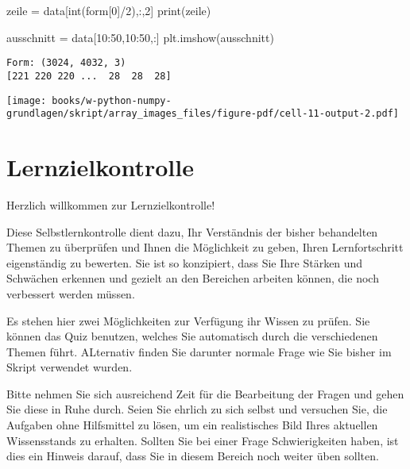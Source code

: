 \documentclass[
  letterpaper,
  DIV=11,
  numbers=noendperiod]{scrreprt}
\newenvironment{Shaded}{\begin{snugshade}}{\end{snugshade}}
\newcommand{\BuiltInTok}[1]{\textcolor[rgb]{0.00,0.23,0.31}{#1}}
\newcommand{\DecValTok}[1]{\textcolor[rgb]{0.68,0.00,0.00}{#1}}
\newcommand{\NormalTok}[1]{\textcolor[rgb]{0.00,0.23,0.31}{#1}}
\newcommand{\OperatorTok}[1]{\textcolor[rgb]{0.37,0.37,0.37}{#1}}
\begin{document}
\begin{tcolorbox}
\begin{tcolorbox}
\begin{tcolorbox}
\begin{Shaded}
\begin{Highlighting}[]
\NormalTok{zeile }\OperatorTok{=}\NormalTok{  data[}\BuiltInTok{int}\NormalTok{(form[}\DecValTok{0}\NormalTok{]}\OperatorTok{/}\DecValTok{2}\NormalTok{),:,}\DecValTok{2}\NormalTok{]}
\BuiltInTok{print}\NormalTok{(zeile)}

\NormalTok{ausschnitt }\OperatorTok{=}\NormalTok{  data[}\DecValTok{10}\NormalTok{:}\DecValTok{50}\NormalTok{,}\DecValTok{10}\NormalTok{:}\DecValTok{50}\NormalTok{,:]}
\NormalTok{plt.imshow(ausschnitt)}
\end{Highlighting}
\end{Shaded}

\begin{verbatim}
Form: (3024, 4032, 3)
[221 220 220 ...  28  28  28]
\end{verbatim}

\texttt{[image: books/w-python-numpy-grundlagen/skript/array\_images\_files/figure-pdf/cell-11-output-2.pdf]}

\end{tcolorbox}

\end{tcolorbox}

\chapter{Lernzielkontrolle}\label{lernzielkontrolle}

Herzlich willkommen zur Lernzielkontrolle!

Diese Selbstlernkontrolle dient dazu, Ihr Verständnis der bisher
behandelten Themen zu überprüfen und Ihnen die Möglichkeit zu geben,
Ihren Lernfortschritt eigenständig zu bewerten. Sie ist so konzipiert,
dass Sie Ihre Stärken und Schwächen erkennen und gezielt an den
Bereichen arbeiten können, die noch verbessert werden müssen.

Es stehen hier zwei Möglichkeiten zur Verfügung ihr Wissen zu prüfen.
Sie können das Quiz benutzen, welches Sie automatisch durch die
verschiedenen Themen führt. ALternativ finden Sie darunter normale Frage
wie Sie bisher im Skript verwendet wurden.

Bitte nehmen Sie sich ausreichend Zeit für die Bearbeitung der Fragen
und gehen Sie diese in Ruhe durch. Seien Sie ehrlich zu sich selbst und
versuchen Sie, die Aufgaben ohne Hilfsmittel zu lösen, um ein
realistisches Bild Ihres aktuellen Wissensstands zu erhalten. Sollten
Sie bei einer Frage Schwierigkeiten haben, ist dies ein Hinweis darauf,
dass Sie in diesem Bereich noch weiter üben sollten.


\end{tcolorbox}
\end{document}
